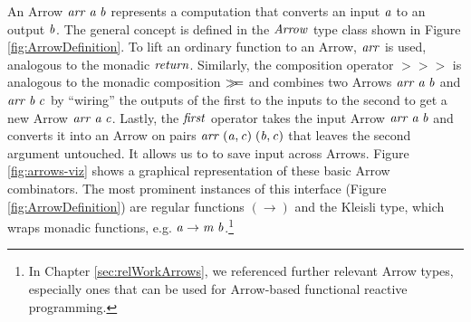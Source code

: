 \documentclass[paper=A4,twoside=true,openright,parskip=full,chapterprefix=true,headings=normal,bibliography=totoc,listof=totoc,titlepage=on,captions=tableabove,draft=false,british]{scrreprt}%
\renewcommand{\enquote}[1]{{``}#1{''}}
\begin{document}
An Arrow \ensuremath{\Varid{arr}\;\Varid{a}\;\Varid{b}} represents a computation that converts an input \ensuremath{\Varid{a}}
to an output \ensuremath{\Varid{b}}. The general concept is defined in the \ensuremath{\Conid{Arrow}} type
class shown in Figure \ref{fig:ArrowDefinition}. To lift an ordinary
function to an Arrow, \ensuremath{\Varid{arr}} is used, analogous to the monadic \ensuremath{\Varid{return}}.
Similarly, the composition operator \ensuremath{\mathbin{>\!\!>\!\!>}} is analogous to the monadic
composition \ensuremath{\bind } and combines two Arrows \ensuremath{\Varid{arr}\;\Varid{a}\;\Varid{b}} and \ensuremath{\Varid{arr}\;\Varid{b}\;\Varid{c}} by
\enquote{wiring} the outputs of the first to the inputs to the second to
get a new Arrow \ensuremath{\Varid{arr}\;\Varid{a}\;\Varid{c}}. Lastly, the \ensuremath{\Varid{first}} operator takes the input
Arrow \ensuremath{\Varid{arr}\;\Varid{a}\;\Varid{b}} and converts it into an Arrow on pairs
\ensuremath{\Varid{arr}\;(\Varid{a},\Varid{c})\;(\Varid{b},\Varid{c})} that leaves the second argument untouched. It allows
us to to save input across Arrows. Figure \ref{fig:arrows-viz} shows a
graphical representation of these basic Arrow combinators. The most
prominent instances of this interface (Figure \ref{fig:ArrowDefinition})
are regular functions \ensuremath{(\to )} and the Kleisli type, which wraps monadic
functions, e.g. \ensuremath{\Varid{a}\to \Varid{m}\;\Varid{b}}.\footnote{In Chapter \ref{sec:relWorkArrows}, we
  referenced further relevant Arrow types, especially ones that can be
  used for Arrow-based functional reactive programming.}
\end{document}
